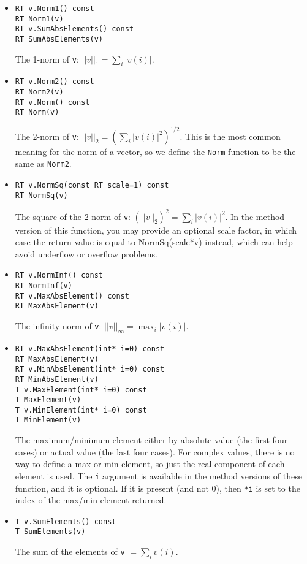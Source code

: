 \documentclass[twoside,letterpaper,11pt]{article}
\renewcommand{\tt}[1]{{\texttt {#1}}}
\begin{document}
\begin{itemize}

\item
\begin{verbatim}
RT v.Norm1() const
RT Norm1(v)
RT v.SumAbsElements() const
RT SumAbsElements(v)
\end{verbatim}
The 1-norm of \tt{v}: $||v||_1 = \sum_i |v(i)|$.

\item
\begin{verbatim}
RT v.Norm2() const
RT Norm2(v)
RT v.Norm() const
RT Norm(v)
\end{verbatim}
The 2-norm of \tt{v}: $||v||_2 = (\sum_i |v(i)|^2)^{1/2}$.
This is the most common meaning for the norm of a vector, so we
define the \tt{Norm} function to be the same as \tt{Norm2}.

\item
\begin{verbatim}
RT v.NormSq(const RT scale=1) const
RT NormSq(v)
\end{verbatim}
The square of the 2-norm of \tt{v}: $(||v||_2)^2 = \sum_i |v(i)|^2$.
In the method version of this function, you may provide an optional scale factor,
in which case the return value is equal to NormSq(scale*v) instead, 
which can help avoid underflow or overflow problems.

\item
\begin{verbatim}
RT v.NormInf() const
RT NormInf(v)
RT v.MaxAbsElement() const
RT MaxAbsElement(v)
\end{verbatim}
The infinity-norm of \tt{v}: $||v||_\infty = \max_i |v(i)|$.

\item
\begin{verbatim}
RT v.MaxAbsElement(int* i=0) const
RT MaxAbsElement(v)
RT v.MinAbsElement(int* i=0) const
RT MinAbsElement(v)
T v.MaxElement(int* i=0) const
T MaxElement(v)
T v.MinElement(int* i=0) const
T MinElement(v)
\end{verbatim}
The maximum/minimum element either by absolute value (the first four cases) or actual value
(the last four cases).  For complex values, there is no way to define a 
max or min element, so just the real component of each element is used.
The \tt{i} argument is available in the method versions of these function, and it is optional.
If it is present (and not 0), then \tt{*i} is set to the 
index of the max/min element returned.

\item
\begin{verbatim}
T v.SumElements() const
T SumElements(v)
\end{verbatim}
The sum of the elements of \tt{v} $= \sum_i v(i)$.

\end{itemize}
\end{document}

